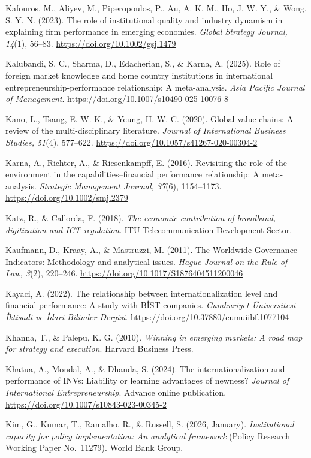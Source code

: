 \documentclass[
  a4paper,
  13pt]{extreport}
\begin{document}
Kafouros, M., Aliyev, M., Piperopoulos, P., Au, A. K. M., Ho, J. W. Y.,
\& Wong, S. Y. N. (2023). The role of institutional quality and industry
dynamism in explaining firm performance in emerging economies.
\emph{Global Strategy Journal, 14}(1), 56--83.
\url{https://doi.org/10.1002/gsj.1479}

Kalubandi, S. C., Sharma, D., Edacherian, S., \& Karna, A. (2025). Role
of foreign market knowledge and home country institutions in
international entrepreneurship-performance relationship: A
meta-analysis. \emph{Asia Pacific Journal of Management}.
\url{https://doi.org/10.1007/s10490-025-10076-8}

Kano, L., Tsang, E. W. K., \& Yeung, H. W.-C. (2020). Global value
chains: A review of the multi-disciplinary literature. \emph{Journal of
International Business Studies, 51}(4), 577--622.
\url{https://doi.org/10.1057/s41267-020-00304-2}

Karna, A., Richter, A., \& Riesenkampff, E. (2016). Revisiting the role
of the environment in the capabilities--financial performance
relationship: A meta-analysis. \emph{Strategic Management Journal,
37}(6), 1154--1173. \url{https://doi.org/10.1002/smj.2379}

Katz, R., \& Callorda, F. (2018). \emph{The economic contribution of
broadband, digitization and ICT regulation}. ITU Telecommunication
Development Sector.

Kaufmann, D., Kraay, A., \& Mastruzzi, M. (2011). The Worldwide
Governance Indicators: Methodology and analytical issues. \emph{Hague
Journal on the Rule of Law, 3}(2), 220--246.
\url{https://doi.org/10.1017/S1876404511200046}

Kayaci, A. (2022). The relationship between internationalization level
and financial performance: A study with BİST companies. \emph{Cumhuriyet
Üniversitesi İktisadi ve İdari Bilimler Dergisi}.
\url{https://doi.org/10.37880/cumuiibf.1077104}

Khanna, T., \& Palepu, K. G. (2010). \emph{Winning in emerging markets:
A road map for strategy and execution}. Harvard Business Press.

Khatua, A., Mondal, A., \& Dhanda, S. (2024). The internationalization
and performance of INVs: Liability or learning advantages of newness?
\emph{Journal of International Entrepreneurship}. Advance online
publication. \url{https://doi.org/10.1007/s10843-023-00345-2}

Kim, G., Kumar, T., Ramalho, R., \& Russell, S. (2026, January).
\emph{Institutional capacity for policy implementation: An analytical
framework} (Policy Research Working Paper No.~11279). World Bank Group.
\end{document}
